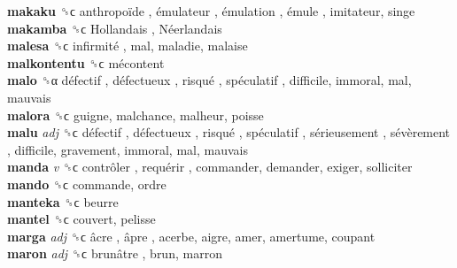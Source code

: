 \textbf{makaku} ␝ϲ   anthropoïde ,  émulateur ,  émulation ,  émule , imitateur, singe  \\
\textbf{makamba} ␝ϲ   Hollandais ,  Néerlandais   \\
\textbf{malesa} ␝ϲ   infirmité , mal, maladie, malaise  \\
\textbf{malkontentu} ␝ϲ   mécontent   \\
\textbf{malo} ␝α   défectif ,  défectueux ,  risqué ,  spéculatif , difficile, immoral, mal, mauvais  \\
\textbf{malora} ␝ϲ  guigne, malchance, malheur, poisse  \\
\textbf{malu} \emph{adj}  ␝ϲ   défectif ,  défectueux ,  risqué ,  spéculatif ,  sérieusement ,  sévèrement , difficile, gravement, immoral, mal, mauvais  \\
\textbf{manda} \emph{v}  ␝ϲ   contrôler ,  requérir , commander, demander, exiger, solliciter  \\
\textbf{mando} ␝ϲ  commande, ordre  \\
\textbf{manteka} ␝ϲ  beurre  \\
\textbf{mantel} ␝ϲ  couvert, pelisse  \\
\textbf{marga} \emph{adj}  ␝ϲ   âcre ,  âpre , acerbe, aigre, amer, amertume, coupant  \\
\textbf{maron} \emph{adj}  ␝ϲ   brunâtre , brun, marron  \\
